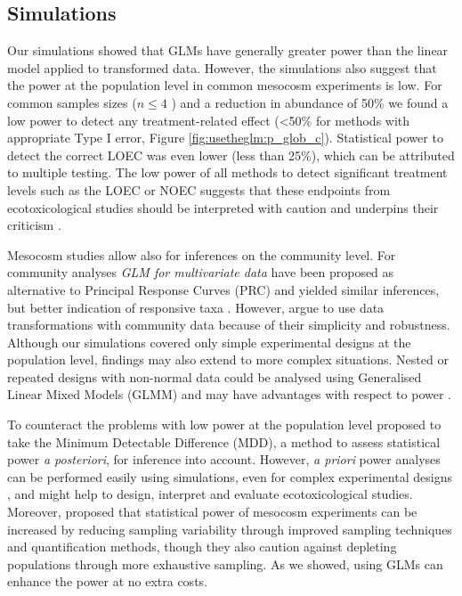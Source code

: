 \subsection{Simulations}
\label{ssec:usetheglm:discsim}
Our simulations showed that GLMs have generally greater power than the linear model applied to transformed data.
However, the simulations also suggest that the power at the population level in common mesocosm experiments is low.
For common samples sizes ($n \le 4$ ) and a reduction in abundance of 50\% we found a low power to detect any treatment-related effect (\textless 50\% for methods with appropriate Type I error, Figure \ref{fig:usetheglm:p_glob_c}).
Statistical power to detect the correct LOEC was even lower (less than 25\%), which can be attributed to multiple testing.
The low power of all methods to detect significant treatment levels such as the LOEC or NOEC suggests that these endpoints from ecotoxicological studies should be interpreted with caution and underpins their criticism \citep{laskowski_good_1995,landis_well_2011}.

Mesocosm studies allow also for inferences on the community level. 
For community analyses \emph{GLM for multivariate data} \citep{warton_distance-based_2012} have been proposed as alternative to Principal Response Curves (PRC) and yielded similar inferences, but better indication of responsive taxa \citep{szocs_analysing_2015}. 
However, \citet{ter_braak_topics_2014} argue to use data transformations with community data because of their simplicity and robustness.
Although our simulations covered only simple experimental designs at the population level, findings may also extend to more complex situations. 
Nested or repeated designs with non-normal data could be analysed using Generalised Linear Mixed Models (GLMM) and may have advantages with respect to power \citep{stroup_rethinking_2014}.

To counteract the problems with low power at the population level \citet{brock_minimum_2015} proposed to take the Minimum Detectable Difference (MDD), a method to assess statistical power \emph{a posteriori}, for inference into account.
However, \emph{a priori} power analyses can be performed easily using simulations, even for complex experimental designs \citep{johnson_power_2015}, and might help to design, interpret and evaluate ecotoxicological studies.
Moreover, \citet{brock_minimum_2015} proposed that statistical power of mesocosm experiments can be increased by reducing sampling variability through improved sampling techniques and quantification methods, though they also caution against depleting populations through more exhaustive sampling.
As we showed, using GLMs can enhance the power at no extra costs.

